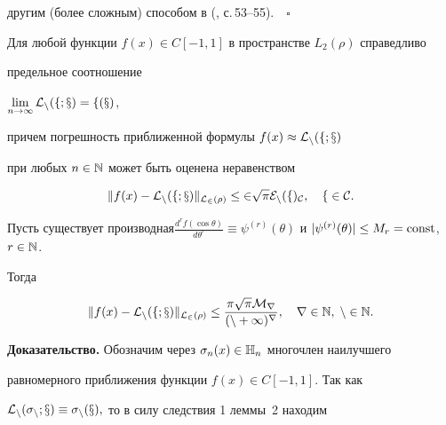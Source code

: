 другим (более сложным) способом в (\cite{8}, с.\,53--55).$\quad\square$








\begin{thm}


Для любой функции $f(x)\in C[-1,1]$ в пространстве $L_2(\rho)$ справедливо


предельное соотношение


$\lim\limits_{n\to \infty}\cal{L}_n(f;x)=f(x)$,


причем погрешность приближенной формулы $f(x)\approx \cal{L}_n(f;x)$ 


при любых $n\in\Bbb{N}$ может быть оценена неравенством


\begin{equation}


\|f(x)-\cal{L}_n(f;x)\|_{L_2(\rho)}\le 2\sqrt{\pi}E_n(f)_C,\quad f\in C.


\end{equation}


\end{thm} 








\begin{cornonum}


Пусть существует производная$\frac{d^r f(\cos \theta)}{d\theta^r}\equiv


\psi^{(r)}(\theta)$ и $|\psi^{(r)}(\theta)|\le M_r=\const$, $r\in \N$.


Тогда


\begin{equation}


\|f(x)-\cal{L}_n(f;x)\|_{L_2(\rho)}\le


\frac{\pi \sqrt{\pi}M_r}{(n+1)^r},\quad r\in \N, \; n\in \N.


\end{equation}


\end{cornonum}








{\bf Доказательство.} Обозначим через $\sigma_n(x)\in \Bbb{H}_n$ многочлен наилучшего 


равномерного приближения функции $f(x)\in C[-1,1]$. Так как


$\cal{L}_n(\sigma_n;x)\equiv \sigma_n(x),$ то в силу следствия 1 леммы~2 находим 


